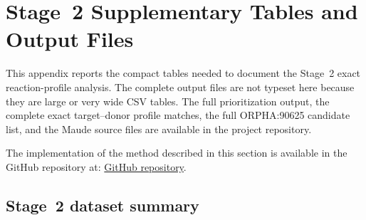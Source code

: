 
\FloatBarrier
\clearpage
\onecolumn
\appendices




\section{Stage~2 Supplementary Tables and Output Files}
\label{app:stage2_supplementary_tables}

This appendix reports the compact tables needed to document the Stage~2 exact reaction-profile analysis. The complete output files are not typeset here because they are large or very wide CSV tables. The full prioritization output, the complete exact target--donor profile matches, the full ORPHA:90625 candidate list, and the Maude source files are available in the project repository.

The implementation of the method described in this section is available in the GitHub repository at:
\href{https://github.com/asma23091978/Maude_paper}{\textcolor{teal!60!black}{GitHub repository}}.

\subsection{Stage~2 dataset summary}
\label{supsec:stage2_dataset_summary}

